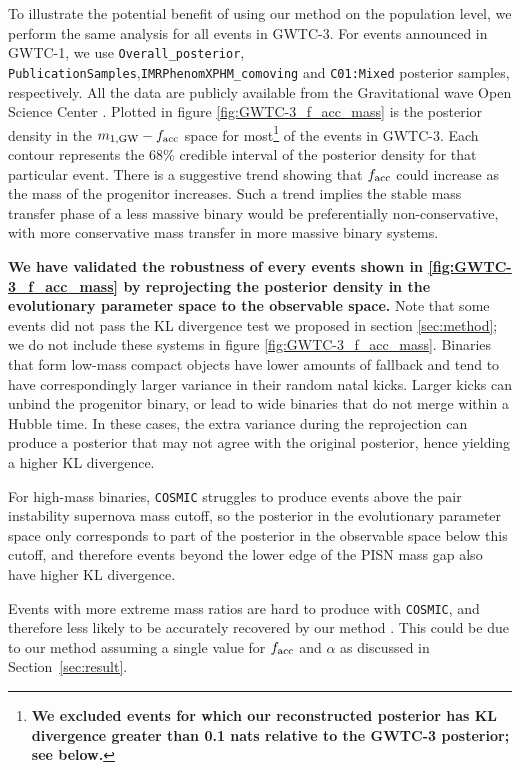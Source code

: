 \documentclass[twocolumn]{aastex631}
\begin{document}
To illustrate the potential benefit of using our method on the population level,
we perform the same analysis for all events in GWTC-3. For events announced in
GWTC-1, we use \texttt{Overall\_posterior},
\texttt{PublicationSamples},\texttt{IMRPhenomXPHM\_comoving} and
\texttt{C01:Mixed} posterior samples, respectively. All the data are publicly
available from the Gravitational wave Open Science Center
\citep{LIGOScientific:2019lzm}. Plotted in figure \ref{fig:GWTC-3_f_acc_mass} is
the posterior density in the $m_{1,{\rm GW}}-f_{\rm acc}$ space for
most\footnote{\textbf{We excluded events for which our reconstructed posterior has KL
divergence greater than 0.1 nats relative to the GWTC-3 posterior; see below.}}
of the events in GWTC-3. Each contour represents the $68\%$ credible interval of
the posterior density for that particular event. There is a suggestive trend
showing that $f_{\rm acc}$ could increase as the mass of the progenitor
increases. Such a trend implies the stable mass transfer phase of a less massive
binary would be preferentially non-conservative, with more conservative mass
transfer in more massive binary systems.

\textbf{We have validated the robustness of every events shown in
\ref{fig:GWTC-3_f_acc_mass} by reprojecting the posterior density in the
evolutionary parameter space to the observable space.} Note that some events did
not pass the KL divergence test we proposed in section \ref{sec:method}; we do
not include these systems in figure \ref{fig:GWTC-3_f_acc_mass}. Binaries that
form low-mass compact objects have lower amounts of fallback and tend to have
correspondingly larger variance in their random natal kicks. Larger kicks can
unbind the progenitor binary, or lead to wide binaries that do not merge within
a Hubble time.  In these cases, the extra variance during the reprojection can
produce a posterior that may not agree with the original posterior, hence
yielding a higher KL divergence.

For high-mass binaries, \texttt{COSMIC} struggles to produce events above the
pair instability supernova mass cutoff, so the posterior in the
evolutionary parameter space only corresponds to part of the posterior in the
observable space below this cutoff, and therefore events beyond the lower edge of the PISN mass
gap also have higher KL divergence.

Events with more extreme mass ratios are hard to produce with \texttt{COSMIC},
and therefore less likely to be accurately recovered by our method
\citep[e.g.][]{Zevin2020}. This could be due to our method assuming a single
value for $f_{\rm acc}$ and $\alpha$ as discussed in Section~\ref{sec:result}.
\end{document}
